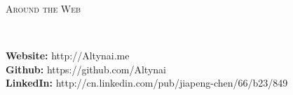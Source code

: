 ﻿\documentclass[9pt]{article}
\newenvironment{changemargin}[2]{%
  \begin{list}{}{%
    \setlength{\topsep}{0pt}%
    \setlength{\leftmargin}{#1}%
    \setlength{\rightmargin}{#2}%
    \setlength{\listparindent}{\parindent}%
    \setlength{\itemindent}{\parindent}%
    \setlength{\parsep}{\parskip}%
  }%
  \item[]}{\end{list}
}
\newcommand{\lineover}{
	\begin{changemargin}{-0.05in}{-0.05in}
		\vspace*{-8pt}
		\hrulefill \\
		\vspace*{-2pt}
	\end{changemargin}
}
\newcommand{\header}[1]{
	\begin{changemargin}{-0.5in}{-0.5in}
		\scshape{#1}\\
  	\lineover
	\end{changemargin}
}
\newenvironment{body} {
	\vspace*{-16pt}
	\begin{changemargin}{-0.25in}{-0.5in}
  }	
	{\end{changemargin}
}
\begin{document}
\smallskip

\header{Around the Web}

\begin{body}
	\vspace{14pt}
    \textbf{Website:} http://Altynai.me \\
    \textbf{Github:} https://github.com/Altynai \\
    \textbf{LinkedIn:} http://cn.linkedin.com/pub/jiapeng-chen/66/b23/849\\
\end{body}
\end{document}

